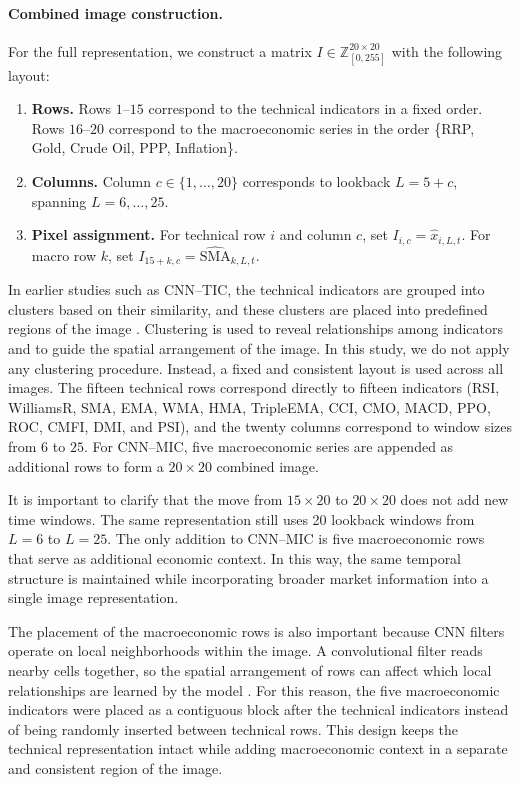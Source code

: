\paragraph{Combined image construction.}
For the full representation, we construct a matrix $I \in \mathbb{Z}^{20 \times 20}_{[0,255]}$ with the following layout:
\begin{enumerate}
	\item \textbf{Rows.} Rows $1\text{–}15$ correspond to the technical indicators in a fixed order. Rows $16\text{–}20$ correspond to the macroeconomic series in the order \{RRP, Gold, Crude Oil, PPP, Inflation\}.
	\item \textbf{Columns.} Column $c \in \{1,\ldots,20\}$ corresponds to lookback $L = 5 + c$, spanning $L = 6,\ldots,25$.
	\item \textbf{Pixel assignment.} For technical row $i$ and column $c$, set $I_{i,c} = \widehat{x}_{i,L,t}$. For macro row $k$, set $I_{15+k,c} = \widehat{\mathrm{SMA}}_{k,L,t}$.
\end{enumerate}
In earlier studies such as CNN--TIC, the technical indicators are grouped into clusters based on their similarity, and these clusters are placed into predefined regions of the image \cite{maratkhan2021deep}. Clustering is used to reveal relationships among indicators and to guide the spatial arrangement of the image. In this study, we do not apply any clustering procedure. Instead, a fixed and consistent layout is used across all images. The fifteen technical rows correspond directly to fifteen indicators (RSI, WilliamsR, SMA, EMA, WMA, HMA, TripleEMA, CCI, CMO, MACD, PPO, ROC, CMFI, DMI, and PSI), and the twenty columns correspond to window sizes from $6$ to $25$. For CNN--MIC, five macroeconomic series are appended as additional rows to form a $20 \times 20$ combined image.

It is important to clarify that the move from $15 \times 20$ to $20 \times 20$ does not add new time windows. The same representation still uses 20 lookback windows from $L=6$ to $L=25$. The only addition to CNN--MIC is five macroeconomic rows that serve as additional economic context. In this way, the same temporal structure is maintained while incorporating broader market information into a single image representation.

The placement of the macroeconomic rows is also important because CNN filters operate on local neighborhoods within the image. 
A convolutional filter reads nearby cells together, so the spatial arrangement of rows can affect which local relationships are learned by the model \cite{ghosh2019spatial}. 
For this reason, the five macroeconomic indicators were placed as a contiguous block after the technical indicators instead of being randomly inserted between technical rows. 
This design keeps the technical representation intact while adding macroeconomic context in a separate and consistent region of the image.

